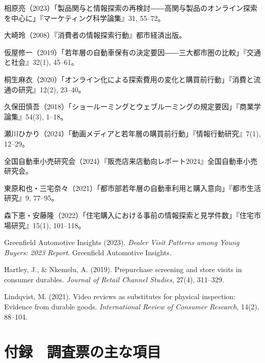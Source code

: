 \begin{references}
  \item 相原亮（2023）「製品関与と情報探索の再検討――高関与製品のオンライン探索を中心に」『マーケティング科学論集』31, 55--72。
  \item 大崎玲（2008）『消費者の情報探索行動』都市経済出版。
  \item 仮屋修一（2019）「若年層の自動車保有の決定要因――三大都市圏の比較」『交通と社会』32(1), 45--61。
  \item 桐生麻衣（2020）「オンライン化による探索費用の変化と購買前行動」『消費と流通の研究』12(2), 23--40。
  \item 久保田慎吾（2018）「ショールーミングとウェブルーミングの規定要因」『商業学論集』54(3), 1--18。
  \item 瀬川ひかり（2024）「動画メディアと若年層の購買前行動」『情報行動研究』7(1), 12--29。
  \item 全国自動車小売研究会（2024）『販売店来店動向レポート2024』全国自動車小売研究会。
  \item 東原和也・三宅奈々（2021）「都市部若年層の自動車利用と購入意向」『都市生活研究』9, 77--95。
  \item 森下恵・安藤隆（2022）「住宅購入における事前の情報探索と見学件数」『住宅市場研究』15(1), 101--118。
  \item Greenfield Automotive Insights (2023). \textit{Dealer Visit Patterns among Young Buyers: 2023 Report}. Greenfield Automotive Insights.
  \item Hartley, J., \& Nkemelu, A. (2019). Prepurchase screening and store visits in consumer durables. \textit{Journal of Retail Channel Studies}, 27(4), 311--329.
  \item Lindqvist, M. (2021). Video reviews as substitutes for physical inspection: Evidence from durable goods. \textit{International Review of Consumer Research}, 14(2), 88--104.
\end{references}

\section*{付録　調査票の主な項目}

